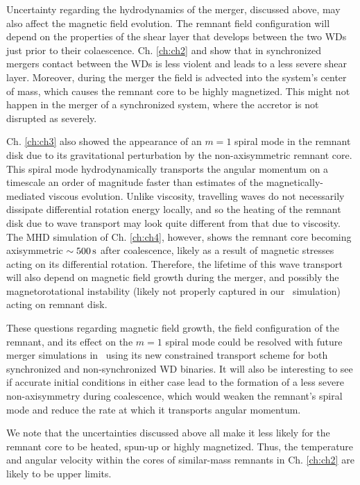 Uncertainty regarding the hydrodynamics of the merger, discussed above, may also affect the magnetic field evolution.  The remnant field configuration will depend on the properties of the shear layer that develops between the two WDs just prior to their colaescence.  Ch. \ref{ch:ch2} and \cite{dan+14} show that in synchronized mergers contact between the WDs is less violent and leads to a less severe shear layer.  Moreover, during the merger the field is advected into the system's center of mass, which causes the remnant core to be highly magnetized.  This might not happen in the merger of a synchronized system, where the accretor is not disrupted as severely.

Ch. \ref{ch:ch3} also showed the appearance of an $m = 1$ spiral mode in the remnant disk due to its gravitational perturbation by the non-axisymmetric remnant core.  This spiral mode hydrodynamically transports the angular momentum on a timescale an order of magnitude faster than estimates of the magnetically-mediated viscous evolution.  Unlike viscosity, travelling waves do not necessarily dissipate differential rotation energy locally, and so the heating of the remnant disk due to wave transport may look quite different from that due to viscosity.  The MHD simulation of Ch. \ref{ch:ch4}, however, shows the remnant core becoming axisymmetric $\sim500\,\mathrm{s}$ after coalescence, likely as a result of magnetic stresses acting on its differential rotation.  Therefore, the lifetime of this wave transport will also depend on magnetic field growth during the merger, and possibly the magnetorotational instability (likely not properly captured in our \arepo\ simulation) acting on remnant disk.

These questions regarding magnetic field growth, the field configuration of the remnant, and its effect on the $m = 1$ spiral mode could be resolved with future merger simulations in \arepo\ using its new constrained transport scheme for both synchronized and non-synchronized WD binaries.  It will also be interesting to see if accurate initial conditions in either case lead to the formation of a less severe non-axisymmetry during coalescence, which would weaken the remnant's spiral mode and reduce the rate at which it transports angular momentum.  

We note that the uncertainties discussed above all make it less likely for the remnant core to be heated, spun-up or highly magnetized.  Thus, the temperature and angular velocity within the cores of similar-mass remnants in Ch. \ref{ch:ch2} are likely to be upper limits.

